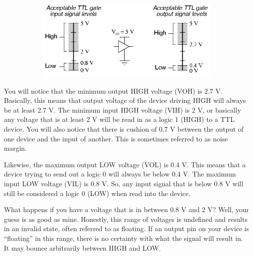 \begin{figure}[H]
\begin{subfigure}[c]{0.15\textwidth}
  \end{subfigure}
  \centering
  \begin{subfigure}[c]{0.7\textwidth}
    \includegraphics[width=\textwidth,frame]{TTL2}
  \end{subfigure}
\end{figure}

You will notice that the minimum output HIGH voltage (VOH) is 2.7 V. Basically,
this means that output voltage of the device driving HIGH will always be at
least 2.7 V. The minimum input HIGH voltage (VIH) is 2 V, or basically any
voltage that is at least 2 V will be read in as a logic 1 (HIGH) to a TTL
device. You will also notice that there is cushion of 0.7 V between the output
of one device and the input of another. This is sometimes referred to as noise
margin.

Likewise, the maximum output LOW voltage (VOL) is 0.4 V. This means that a
device trying to send out a logic 0 will always be below 0.4 V. The maximum
input LOW voltage (VIL) is 0.8 V. So, any input signal that is below 0.8 V will
still be considered a logic 0 (LOW) when read into the device.

What happens if you have a voltage that is in between 0.8 V and 2 V? Well, your
guess is as good as mine. Honestly, this range of voltages is undefined and
results in an invalid state, often referred to as floating. If an output pin on
your device is ``floating'' in this range, there is no certainty with what the
signal will result in. It may bounce arbitrarily between HIGH and LOW.

